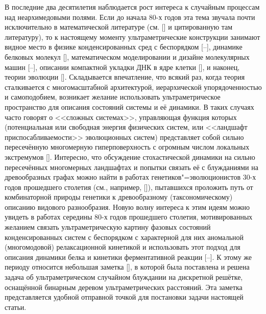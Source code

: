  В последние два десятилетия наблюдается рост
интереса к случайным процессам над неархимедовыми полями. Если до
начала 80-х годов эта тема звучала почти исключительно в
математической литературе (см. [] и цитированную там литературу), то к
настоящему моменту ультраметрические конструкции занимают видное
место в физике конденсированных сред с беспорядком
[--], динамике
белковых молекул [],
математическом моделировании и дизайне молекулярных машин
[--],
описании компактной укладки ДНК в ядре клетки
[], и наконец, теории
эволюции [].  Складывается впечатление,
что всякий раз, когда теория сталкивается с многомасштабной
архитектурой, иерархической упорядоченностью и самоподобием,
возникает желание использовать ультраметрическое пространство для
описания состояний системы и её динамики. В таких случаях часто
говорят о <<сложных системах>>, управляющая функция которых
(потенциальная или свободная энергия физических систем, или
<<ландшафт приспосабливаемости>> эволюционных систем) представляет
собой сильно пересечённую многомерную гиперповерхность с огромным
числом локальных экстремумов [].  Интересно, что обсуждение стохастической
динамики на сильно пересечённых многомерных ландшафтах и попытки
связать её с блужданиями на древообразных графах можно найти в
работах генетиков"=эволюционистов \mbox{30-х} годов прошедшего столетия
(см., например, []), пытавшихся проложить
путь от комбинаторной природы генетики к древообразному
(таксономичес\-кому) описанию видового разнообразия. Новую волну
интереса к этим идеям можно увидеть в работах середины \mbox{80-х} годов
прошедшего столетия, мотивированных желанием связать
ультраметрическую картину фазовых состояний конденсированных
систем с беспорядком с характерной для них аномальной
(многомодовой) релаксационной  кинетикой и использовать этот
подход для  описания динамики белка и кинетики ферментативной
реакции [--]. К этому
же периоду относится небольшая заметка [], в
которой была поставлена и решена задача об ультраметрическом
случайном блуждании на дискретной решётке, оснащённой бинарным
деревом ультраметрических расстояний. Эта заметка представляется
удобной отправной точкой для постановки задачи настоящей статьи.


